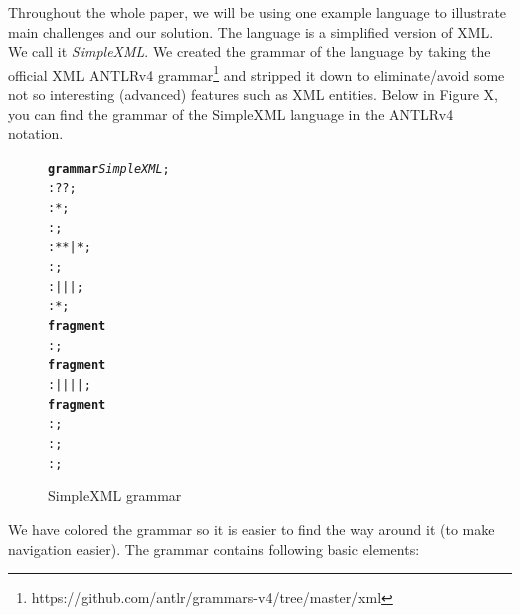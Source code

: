 Throughout the whole paper, we will be using one example language to illustrate main challenges and our solution.
The language is a simplified version of XML. We call it \emph{SimpleXML}.
We created the grammar of the language by taking the official XML ANTLRv4 grammar\footnote{https://github.com/antlr/grammars-v4/tree/master/xml} and stripped it down to eliminate/avoid some not so interesting (advanced) features such as XML entities.
Below in Figure X, you can find the grammar of the SimpleXML language in the ANTLRv4 notation.

\begin{figure}[ht]
\centering
\begin{framed}
\begin{alltt}
	\textbf{grammar} \textit{SimpleXML};
	  : ? ?  ;
	    :  *  ;
	   : \antlrliteral{<!--}  \antlrliteral{-->} ;
	   : \antlrliteral{<}  * \antlrliteral{>} * \antlrliteral{</}  \antlrliteral{>} | \antlrliteral{<}  * \antlrliteral{/>} ;
	    :     ;
	   :  |  |  |  ;
	      :  * ;
	\textbf{fragment}
	     : \antlrregex{[0-9]} ;
	\textbf{fragment}
	  :  | \antlrliteral{-} | \antlrliteral{\_} |  |  ;
	\textbf{fragment}
	 : \antlrregex{[:a-zA-Z]} ;
	      : \antlrregex{~[<"]*} ;
	     : \antlrliteral{<![CDATA[}  \antlrliteral{]]>} ;
\end{alltt}
\end{framed}
\caption{SimpleXML grammar}
\end{figure}

We have colored the grammar so it is easier to find the way around it (to make navigation easier).
The grammar contains following basic elements:

